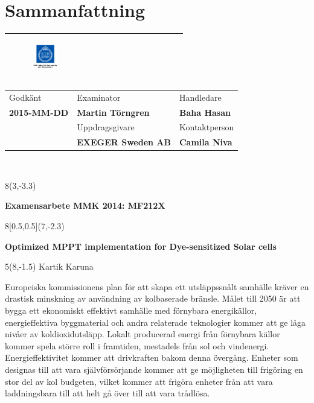 \chapter*{Sammanfattning}
\thispagestyle{begin}

\begin{tabular}{ | p{\dimexpr \linewidth-2\tabcolsep} |} \hline
 \begin{figure}[H]
        
        \includegraphics[width=0.2\textwidth]{images/indust} 
             \end{figure}  \\\hline
\end{tabular}   
\begin{tabular}{ | p{} |
                  p{} |
                  p{} |} \hline
                 Godkänt & Examinator & Handledare \\
                  \textbf{2015-MM-DD}  & \textbf{Martin Törngren} & \textbf{Baha Hasan} \\\hline
                   & Uppdragsgivare & Kontaktperson \\
                   & \textbf{EXEGER Sweden AB} & \textbf{Camila Niva}\\ \hline
\end{tabular} \\
\begin{textblock}{8}(3,-3.3)
\begin{center}
\textbf{Examensarbete MMK 2014: MF212X }
\end{center}
\end{textblock}
\begin{textblock}{8}[0.5,0.5](7,-2.3)
\begin{center}
\textbf{Optimized MPPT implementation for Dye-sensitized Solar cells}
\end{center}
\end{textblock}
\begin{textblock}{5}(8,-1.5)
Kartik Karuna
\end{textblock}
Europeiska kommissionens plan för att skapa ett utsläppssnålt samhälle kräver en
drastisk minskning av användning av kolbaserade bränsle. Målet till 2050 är att bygga
ett ekonomiskt effektivt samhälle med förnybara energikällor, energieffektiva byggmaterial
och andra relaterade teknologier kommer att ge låga nivåer av koldioxidutsläpp. Lokalt producerad energi från förnybara källor kommer spela större roll i framtiden, mestadels från sol och vindenergi. Energieffektivitet kommer att drivkraften bakom denna övergång. Enheter som designas till att vara självförsörjande kommer att ge möjligheten till frigöring en stor del av kol budgeten, vilket kommer att frigöra enheter från att vara laddningsbara till att helt
gå över till att vara trådlösa.

